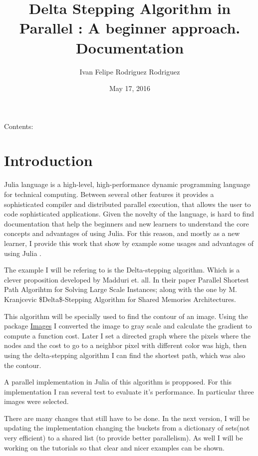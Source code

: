 \documentclass[letterpaper,10pt,english]{sphinxmanual}
\title{Delta Stepping Algorithm in Parallel : A beginner approach. Documentation}
\date{May 17, 2016}
\author{Ivan Felipe Rodriguez Rodriguez}
\begin{document}
\maketitle
\tableofcontents
{}\label{index::doc}


Contents:


\chapter{Introduction}
\label{Introduction:introduction}\label{Introduction:welcome-to-delta-stepping-algorithm-in-julia-a-beginner-approach-s-documentation}\label{Introduction::doc}\label{Introduction:id1}
Julia language is a high-level, high-performance dynamic programming language for technical computing. Between several other features  it provides a sophisticated compiler and distributed parallel execution, that allows the user to code sophisticated applications. Given the novelty of the language, is hard to find documentation that help the beginners and new learners to understand the core concepts and advantages of using Julia. For this reason, and mostly as a new learner, I provide this work that show by example some usages and advantages of using Julia .

The example I will be refering to is the Delta-stepping algorithm. Which is a clever proposition developed by  Madduri et. all. In their paper Parallel Shortest Path Algorihtm for Solving Large Scale Instances; along with the one by M. Kranjcevic \$Delta\$-Stepping Algorithm for Shared Memories Architectures.

This algorithm will be specially used  to find the contour of an image. Using the package \href{https://github.com/timholy/Images.jl}{Images} I converted the image to gray scale and calculate the gradient to compute a function cost. Later I  set a directed graph where the pixels where the nodes and the cost to go to a neighbor pixel with different color was high, then using the delta-stepping algorithm I can find the shortest path, which was also the contour.

A parallel implementation in Julia of this algorithm is propposed. For this implementation I ran several test to evaluate it's performance. In particular three images were selected.

There are many changes that still have to be done. In the next version, I will be updating the implementation changing the buckets from a dictionary of sets(not very efficient) to a shared list (to provide better parallelism). As well I will be working on the tutorials so that clear and nicer examples can be shown.
\end{document}
